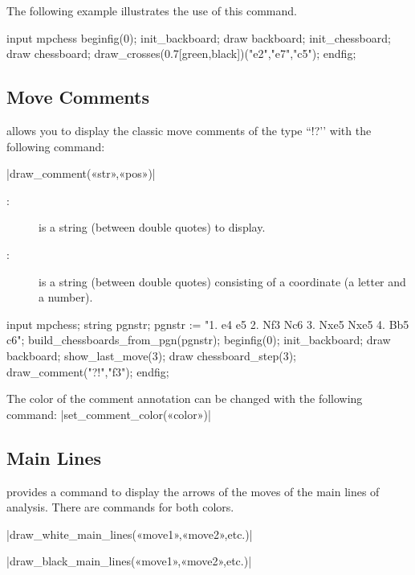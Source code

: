 \documentclass[english]{ltxdoc}
\begin{document}
The following example illustrates the use of this command.

  
\begin{ExempleMP}
input mpchess
beginfig(0);
init_backboard;
draw backboard;
init_chessboard;
draw chessboard;
draw_crosses(0.7[green,black])("e2","e7","c5");
endfig;
\end{ExempleMP}

\subsection{Move Comments}

\mpchess allows you to display the classic move comments of the type
``!?’’ with the following command:

\commande|draw_comment(«str»,«pos»)|\smallskip

\begin{description}
\item[:] is a string (between double quotes) to display.
\item[:] is a string (between double quotes) consisting
of a coordinate (a letter and a number).
\end{description}

\begin{ExempleMP}
input mpchess;
string pgnstr;
pgnstr := "1. e4 e5 2. Nf3 Nc6 3. Nxe5 Nxe5 4. Bb5 c6";
build_chessboards_from_pgn(pgnstr);
beginfig(0);
init_backboard;
draw backboard;
show_last_move(3);
draw chessboard_step(3); %
draw_comment("?!","f3");
endfig;
\end{ExempleMP}

The color of the comment annotation can be changed with the following command:
\commande|set_comment_color(«color»)|\smallskip


\subsection{Main Lines}

\mpchess provides a command to display the arrows of the moves of the
main lines of analysis. There are commands for both colors. 

\commande|draw_white_main_lines(«move1»,«move2»,etc.)|\smallskip

\commande|draw_black_main_lines(«move1»,«move2»,etc.)|\smallskip
\end{document}

